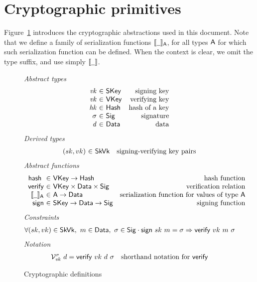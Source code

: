 \section{Cryptographic primitives}
\label{sec:crypto-primitives}

Figure~\ref{fig:crypto-defs} introduces the cryptographic abstractions used in
this document. Note that we define a family of serialization functions
$\serialised{\wcard}_\type{A}$, for all types $\mathsf{A}$ for which such
serialization function can be defined. When the context is clear, we omit the
type suffix, and use simply $\serialised{\wcard}$.

\begin{figure}[htb]
  \emph{Abstract types}
  \begin{equation*}
    \begin{array}{r@{~\in~}lr}
      \var{vk} & \SKey & \text{signing key}\\
      \var{vk} & \VKey & \text{verifying key}\\
      \var{hk} & \Hash & \text{hash of a key}\\
      \sigma & \Sig  & \text{signature}\\
      \var{d} & \Data  & \text{data}\\
    \end{array}
  \end{equation*}
  \emph{Derived types}
  \begin{equation*}
    \begin{array}{r@{~\in~}lr}
      (sk, vk) & \SkVk & \text{signing-verifying key pairs}
    \end{array}
  \end{equation*}
  \emph{Abstract functions}
  \begin{equation*}
    \begin{array}{r@{~\in~}lr}
      \hash{} & \VKey \to \Hash
      & \text{hash function} \\
      \fun{verify} & \VKey \times \Data \times \Sig
      & \text{verification relation}\\
      \serialised{\wcard}_\type{A} & \type{A} \to \Data
      & \text{serialization function for values of type $\type{A}$}\\
      \fun{sign} & \SKey \to \Data \to \Sig
      & \text{signing function}
    \end{array}
  \end{equation*}
  \emph{Constraints}
  \begin{align*}
    & \forall (sk, vk) \in \mathsf{SkVk},~ m \in \mathsf{Data},~ \sigma \in \mathsf{Sig} \cdot
      \mathsf{sign} ~ sk ~ m = \sigma \Rightarrow \mathsf{verify} ~ vk ~ m ~ \sigma
  \end{align*}
  \emph{Notation}
  \begin{align*}
    & \mathcal{V}^\sigma_{\mathit{vk}}~{d} = \mathsf{verify} ~ vk ~ d ~ \sigma
      & \text{shorthand notation for } \mathsf{verify}
  \end{align*}
  \caption{Cryptographic definitions}
  \label{fig:crypto-defs}
\end{figure}

